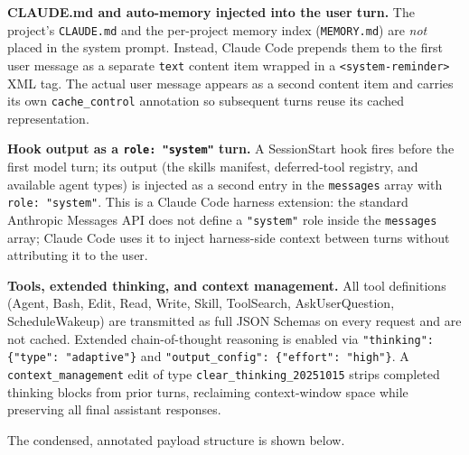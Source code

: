 \documentclass[conference]{IEEEtran}
\begin{document}
\textbf{CLAUDE.md and auto-memory injected into the user turn.}
The project's \texttt{CLAUDE.md} and the per-project memory index
(\texttt{MEMORY.md}) are \emph{not} placed in the system prompt.
Instead, Claude Code prepends them to the first user message as a separate
\texttt{text} content item wrapped in a \texttt{<system-reminder>} XML tag.
The actual user message appears as a second content item and carries its own
\texttt{cache\_control} annotation so subsequent turns reuse its cached
representation.

\textbf{Hook output as a \texttt{role: "system"} turn.}
A SessionStart hook fires before the first model turn; its output (the skills
manifest, deferred-tool registry, and available agent types) is injected as
a second entry in the \texttt{messages} array with \texttt{role: "system"}.
This is a Claude Code harness extension: the standard Anthropic Messages API
does not define a \texttt{"system"} role inside the \texttt{messages} array;
Claude Code uses it to inject harness-side context between turns without
attributing it to the user.

\textbf{Tools, extended thinking, and context management.}
All tool definitions (Agent, Bash, Edit, Read, Write, Skill, ToolSearch,
AskUserQuestion, ScheduleWakeup) are transmitted as full JSON Schemas on every
request and are not cached.
Extended chain-of-thought reasoning is enabled via
\texttt{"thinking": \{"type": "adaptive"\}} and
\texttt{"output\_config": \{"effort": "high"\}}.
A \texttt{context\_management} edit of type
\texttt{clear\_thinking\_20251015} strips completed thinking blocks from prior
turns, reclaiming context-window space while preserving all final assistant
responses.

The condensed, annotated payload structure is shown below.
\end{document}
